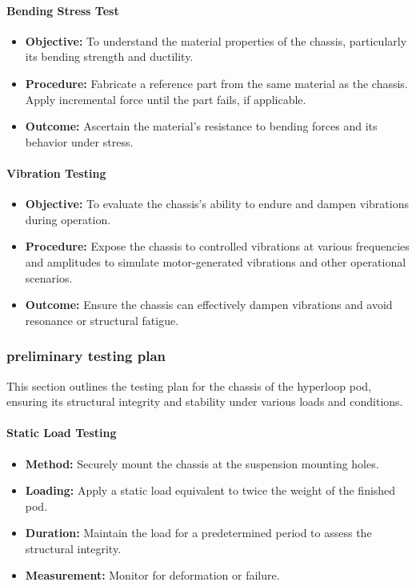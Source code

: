 \paragraph{Bending Stress Test}
\begin{itemize}
    \item \textbf{Objective:} To understand the material properties of the chassis, particularly its bending strength and ductility.
    \item \textbf{Procedure:} Fabricate a reference part from the same material as the chassis. Apply incremental force until the part fails, if applicable.
    \item \textbf{Outcome:} Ascertain the material's resistance to bending forces and its behavior under stress.
\end{itemize}

\paragraph{Vibration Testing}
\begin{itemize}
    \item \textbf{Objective:} To evaluate the chassis's ability to endure and dampen vibrations during operation.
    \item \textbf{Procedure:} Expose the chassis to controlled vibrations at various frequencies and amplitudes to simulate motor-generated vibrations and other operational scenarios.
    \item \textbf{Outcome:} Ensure the chassis can effectively dampen vibrations and avoid resonance or structural fatigue.
\end{itemize}


\subsubsection{preliminary testing plan}

This section outlines the testing plan for the chassis of the hyperloop pod, ensuring its structural integrity and stability under various loads and conditions.

\paragraph{Static Load Testing}
\begin{itemize}
    \item \textbf{Method:} Securely mount the chassis at the suspension mounting holes.
    \item \textbf{Loading:} Apply a static load equivalent to twice the weight of the finished pod.
    \item \textbf{Duration:} Maintain the load for a predetermined period to assess the structural integrity.
    \item \textbf{Measurement:} Monitor for deformation or failure.
\end{itemize}

